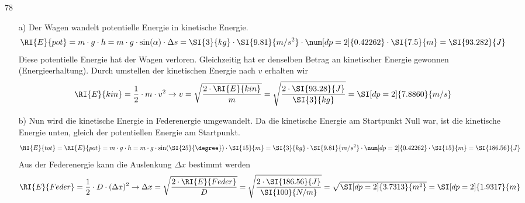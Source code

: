 \documentclass[12pt,a4paper,twoside]{article}
\begin{document}
\begin{ex@loesung}{78}
\begin{itemize}
\item [a)] Der Wagen wandelt potentielle Energie in kinetische Energie.
\begin{eqnarray*}
\RI{E}{pot}= m\cdot g\cdot h=m\cdot g\cdot\sin(\alpha)\cdot \Delta s =\SI{3}{kg}\cdot\SI{9.81}{m/s^2}\cdot\num[dp=2]{0.42262}\cdot\SI{7.5}{m}=\SI{93.282}{J}
\end{eqnarray*}
Diese potentielle Energie hat der Wagen verloren. Gleichzeitig hat er denselben Betrag an kinetischer Energie gewonnen (Energieerhaltung).
Durch umstellen der kinetischen Energie nach $v$ erhalten wir
\begin{eqnarray*}
\RI{E}{kin}=\frac{1}{2}\cdot m\cdot v^2 \to v=\sqrt{\frac{2\cdot \RI{E}{kin}}{m}}=\sqrt{\frac{2\cdot\SI{93.28}{J}}{\SI{3}{kg}}}=\SI[dp=2]{7.8860}{m/s}
\end{eqnarray*}

\item[b)] Nun wird die kinetische Energie in Federenergie umgewandelt.
Da die kinetische Energie am Startpunkt Null war, ist die kinetische Energie unten, gleich der potentiellen Energie am Startpunkt.
\begin{eqnarray*}
\RI{E}{tot}=\RI{E}{pot}=m\cdot g\cdot h=m\cdot g\cdot\sin(\SI{25}{\degree})\cdot\SI{15}{m}=\SI{3}{kg}\cdot\SI{9.81}{m/s^2}\cdot\num[dp=2]{0.42262}\cdot\SI{15}{m}=\SI{186.56}{J}
\end{eqnarray*}
Aus der Federenergie kann die Auslenkung $\Delta x$ bestimmt werden
\begin{eqnarray*}
\RI{E}{Feder}=\frac{1}{2}\cdot D\cdot(\Delta x)^2 \to \Delta x = \sqrt{\frac{2\cdot\RI{E}{Feder}}{D}}=\sqrt{\frac{2\cdot\SI{186.56}{J}}{\SI{100}{N/m}}}=\sqrt{\SI[dp=2]{3.7313}{m^2}}=\SI[dp=2]{1.9317}{m}
\end{eqnarray*}


\end{itemize}
\end{ex@loesung}
\end{document}

